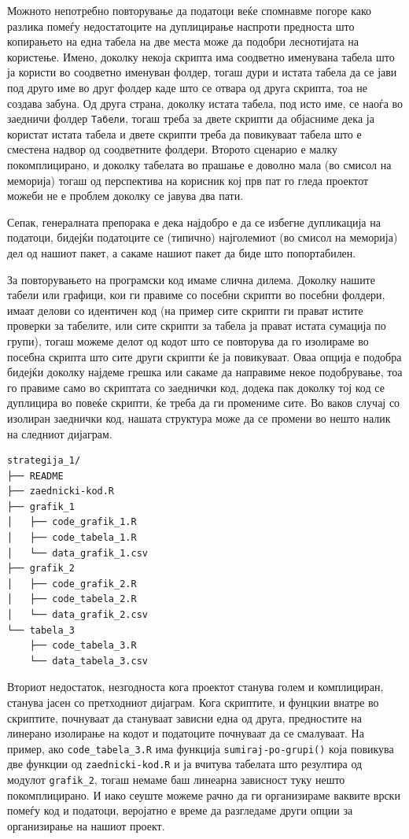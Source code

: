 \documentclass[
]{book}
\begin{document}
Можното непотребно повторување да податоци веќе спомнавме погоре како разлика помеѓу недостатоците на дуплицирање наспроти предноста што копирањето на една табела на две места може да подобри леснотијата на користење. Имено, доколку некоја скрипта има соодветно именувана табела што ја користи во соодветно именуван фолдер, тогаш дури и истата табела да се јави под друго име во друг фолдер каде што се отвара од друга скрипта, тоа не создава забуна. Од друга страна, доколку истата табела, под исто име, се наоѓа во заедничи фолдер \texttt{Табели}, тогаш треба за двете скрипти да објасниме дека ја користат истата табела и двете скрипти треба да повикуваат табела што е сместена надвор од соодветните фолдери. Второто сценарио е малку покомплицирано, и доколку табелата во прашање е доволно мала (во смисол на меморија) тогаш од перспектива на корисник кој прв пат го гледа проектот можеби не е проблем доколку се јавува два пати.

Сепак, генералната препорака е дека најдобро е да се избегне дупликација на податоци, бидејќи податоците се (типично) најголемиот (во смисол на меморија) дел од нашиот пакет, а сакаме нашиот пакет да биде што попортабилен.

За повторувањето на програмски код имаме слична дилема. Доколку нашите табели или графици, кои ги правиме со посебни скрипти во посебни фолдери, имаат делови со идентичен код (на пример сите скрипти ги прават истите проверки за табелите, или сите скрипти за табела ја прават истата сумација по групи), тогаш можеме делот од кодот што се повторува да го изолираме во посебна скрипта што сите други скрипти ќе ја повикуваат. Оваа опција е подобра бидејќи доколку најдеме грешка или сакаме да направиме некое подобрување, тоа го правиме само во скриптата со заеднички код, додека пак доколку тој код се дуплицира во повеќе скрипти, ќе треба да ги промениме сите. Во ваков случај со изолиран заеднички код, нашата структура може да се промени во нешто налик на следниот дијаграм.

\begin{verbatim}
strategija_1/
├── README
├── zaednicki-kod.R
├── grafik_1
│   ├── code_grafik_1.R
│   ├── code_tabela_1.R
│   └── data_grafik_1.csv
├── grafik_2
│   ├── code_grafik_2.R
│   ├── code_tabela_2.R
│   └── data_grafik_2.csv
└── tabela_3
    ├── code_tabela_3.R
    └── data_tabela_3.csv
\end{verbatim}

Вториот недостаток, незгодноста кога проектот станува голем и комплициран, станува јасен со претходниот дијаграм. Кога скриптите, и фунцкии внатре во скриптите, почнуваат да стануваат зависни една од друга, предностите на линерано изолирање на кодот и податоците почнуваат да се смалуваат. На пример, ако \texttt{code\_tabela\_3.R} има функција \texttt{sumiraj-po-grupi()} која повикува две функции од \texttt{zaednicki-kod.R} и ја вчитува табелата што резултира од модулот \texttt{grafik\_2}, тогаш немаме баш линеарна зависност туку нешто покомплицирано. И иако сеуште можеме рачно да ги организираме ваквите врски помеѓу код и податоци, веројатно е време да разгледаме други опции за организирање на нашиот проект.
\end{document}
